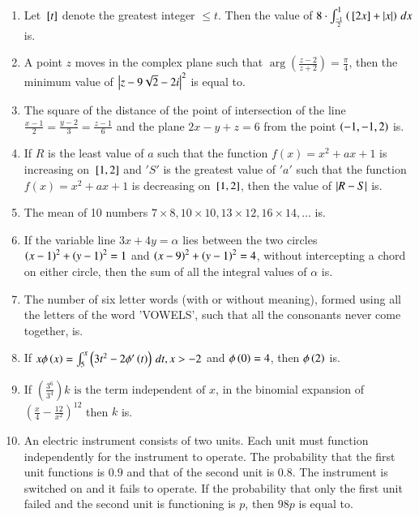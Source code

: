 \documentclass[journal,12pt,onecolumn]{IEEEtran}
\theoremstyle{remark}
\begin{document}
\begin{enumerate}[start=1]
\item Let ${}\left[t\right]$ denote the greatest integer $\leq t$. Then the value of $8 \cdot \int_{\frac{-1}{2}}^{1} \left({}\left[2x\right] + \left\vert x\right\vert \right)\, dx $
is.
\item A point $z$ moves in the complex plane such that 
$\arg\left(\frac{z - 2}{z + 2}\right) = \frac{\pi}{4}$, then the minimum value of $\left\vert z - 9\sqrt{2} - 2i\right\vert^2$ is equal to.
\item  The square of the distance of the point of intersection of the line 
$\frac{x - 1}{2} = \frac{y - 2}{3} = \frac{z - 1}{6}$
and the plane $2x - y + z = 6$ from the point $\left(-1, -1, 2\right)$ is.
\item If $R$ is the least value of $a$ such that the function $f(x) = x^2 + ax + 1$ is increasing on ${}\left[1, 2\right]$ and $'S'$ is the greatest value of $'a'$ such that the function $f(x) = x^2 + ax + 1$ is decreasing on ${}\left[1, 2\right]$, then the value of $\left\vert R - S\right\vert$ is.
\item The mean of 10 numbers $7 \times 8, 10 \times 10, 13 \times 12, 16 \times 14, \dots$ is.
\item  If the variable line $3x + 4y = \alpha$ lies between the two circles $\left(x - 1\right)^2 + \left(y - 1\right)^2 = 1$ and $\left(x - 9\right)^2 + \left(y - 1\right)^2 = 4$, without intercepting a chord on either circle, then the sum of all the integral values of $\alpha$ is.
\item The number of six letter words (with or without meaning), formed using all the letters of the word 'VOWELS', such that all the consonants never come together, is.
\item If $x\phi\left(x\right) =\int_{5}^{x}\left(3t^2 - 2\phi^\prime\left(t\right)\right)\, dt, x > -2$
and $\phi\left(0\right) = 4$, then $\phi\left(2\right)$ is.
\item If $\left(\frac{3^6}{3^4}\right)k \text{ is the term independent of } x$, in the binomial expansion of $\left(\frac{x}{4} - \frac{12}{x^2}\right)^{12}
$ then $k$ is.
\item An electric instrument consists of two units. Each unit must function independently for the instrument to operate. The probability that the first unit functions is $0.9$ and that of the second unit is $0.8$. The instrument is switched on and it fails to operate. If the probability that only the first unit failed and the second unit is functioning is $p$, then $98p$ is equal to.
\end{enumerate}
\end{document}

